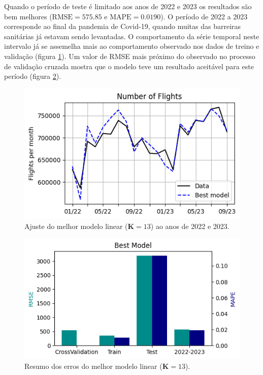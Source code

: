 \documentclass[final,5p]{elsarticle}
\numberwithin{equation}{section}
\begin{document}
    Quando o período de teste é limitado aos anos de 2022 e 2023 os resultados são bem melhores ($\text{RMSE} = 575.85$ e $\text{MAPE} = 0.0190$). O período de 2022 a 2023 corresponde ao final da pandemia de Covid-19, quando muitas das barreiras sanitárias já estavam sendo levantadas. O comportamento da série temporal neste intervalo já se assemelha mais ao comportamento observado nos dados de treino e validação (figura \ref{fig:melhor_modelo_2223}). Um valor de RMSE mais próximo do observado no processo de validação cruzada mostra que o modelo teve um resultado aceitável para este período (figura \ref{fig:erros_melhor_modelo}).

        \begin{figure}[hbt!]
            \includegraphics[width=0.95\columnwidth]{B3_BestModel22_23.png}
            \caption{Ajuste do melhor modelo linear ($\textbf{K} = 13$) ao anos de 2022 e 2023.}
            \label{fig:melhor_modelo_2223}
        \end{figure}

        \begin{figure}[hbt!]
            \includegraphics[width=0.95\columnwidth]{B3_RMSE.png}
            \caption{Resumo dos erros do melhor modelo linear ($\textbf{K} = 13$).}
            \label{fig:erros_melhor_modelo}
        \end{figure}
\end{document}
